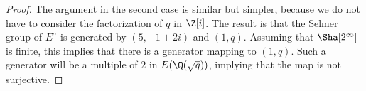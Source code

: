 \documentclass[12pt]{amsart}
\begin{document}
\begin{proof}
The argument in the second case is similar but simpler, because we do not have to consider the
factorization of $q$ in $\Z[i]$.  The result is that the Selmer group of $E^\sigma$ is
generated by $(5,-1+2i)$ and $(1,q)$.  Assuming that $\Sha[2^\infty]$ is finite, this implies
that there is a generator mapping to $(1,q)$.  Such a generator will be a multiple of $2$
in $E(\Q(\sqrt{q}))$, implying that the map is not surjective.
%
%
%
%
\end{proof}
\end{document}
